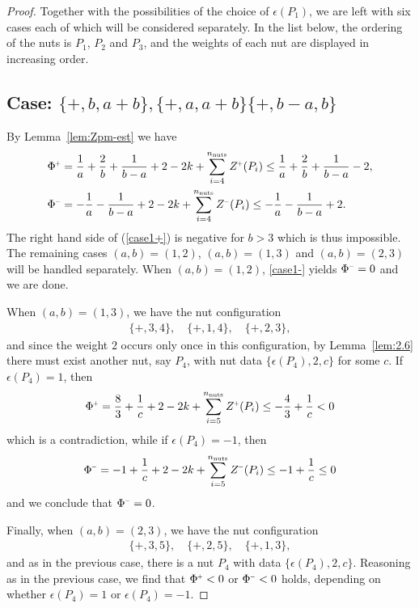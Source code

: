 \documentclass[a4paper,10pt,reqno]{amsart}
\newcommand{\nut}{P}
\theoremstyle{plain}
\newcommand{\nnuts}{n_{\text{\rm nuts}}}
\renewcommand{\P}[1]{{{#1}^{\hspace{-.5pt}\scaleto{+}{4pt}}}}
\newcommand{\M}[1]{{{#1}^{\hspace{-.5pt}\scaleto{-}{4pt}}}}
\numberwithin{equation}{section}
\begin{document}
\begin{proof}
Together with the possibilities of the choice of $\epsilon(\nut_1)$, we are left with six cases each of which will be considered separately. In the list below, the ordering of the nuts is $P_1$, $P_2$ and $P_3$, and the weights of each nut are displayed in increasing order.

\subsection*{Case: $\{+,b,a+b\},\{+,a,a+b\} \{+,b-a ,b\}$}
By Lemma~\ref{lem:Zpm-est} we have
\begin{align} 
\P{\Phi}
&=   
\frac{1}{a}+\frac{2}{b}+\frac{1}{b-a} +2-2k +\sum_{i=4}^{\nnuts}\P{Z}(\nut_i)
\leq 
\frac{1}{a}+\frac{2}{b}+\frac{1}{b-a}-2, \label{case1+}\\
\M{\Phi}
&= 
-\frac{1}{a} -\frac{1}{b-a} +2-2k +\sum_{i=4}^{\nnuts}\M{Z}(\nut_i)
\leq 
-\frac{1}{a} -\frac{1}{b-a} + 2. \label{case1-} 
\end{align}
The right hand side of (\ref{case1+}) is negative for $b>3$ which is thus impossible. The remaining cases $(a,b) =(1,2)$, $(a,b)=(1,3)$ and $(a,b)=(2,3)$ will be handled separately. When $(a,b) = (1,2)$, \eqref{case1-} yields $\M{\Phi} = 0$ and we are done.
 
When $(a,b)=(1,3)$, we have the nut configuration 
\begin{align} 
\{+,3,4\}, \quad \{+,1,4\}, \quad \{+,2,3\}, 
\end{align} 
and since the weight $2$ occurs only once in this configuration, by Lemma~\ref{lem:2.6} there must exist another nut, say $\nut_4$, with nut data $\{\epsilon(\nut_4),2,c\}$ for some $c$. If $\epsilon(\nut_4)=1$, then
\begin{align}
\P{\Phi}
=\frac{8}{3}+\frac{1}{c} +2-2k +\sum_{i=5}^{\nnuts}\P{Z}(\nut_i)
\leq -\frac{4}{3}+\frac{1}{c}
<0
\end{align} 
which is a contradiction, while if $\epsilon(\nut_4)=-1$, then 
\begin{align}
\M{\Phi}
=-1+\frac{1}{c} +2-2k +\sum_{i=5}^{\nnuts}\M{Z}(\nut_i)
\leq-1+\frac{1}{c}
\leq 0
\end{align}
and we conclude that $\M{\Phi} = 0$.

Finally, when $(a,b)=(2,3)$, we have the nut configuration 
\begin{align} 
\{+,3,5\},\quad \{+,2,5\}, \quad \{+,1,3\}, 
\end{align} 
and as in the previous case, there is a nut $\nut_4$ with data $\{\epsilon(\nut_4),2,c\}$. Reasoning as in the previous case, we find that $\P{\Phi} < 0$ or $\M{\Phi} < 0$ holds, depending on whether $\epsilon(\nut_4)=1$ or $\epsilon(\nut_4)=-1$.


\end{proof}
\end{document}
